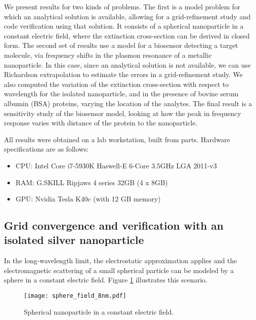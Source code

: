 
We present results for two kinds of problems. 
The first is a model problem for which an analytical solution is available, 
allowing for a grid-refinement study and code verification using that solution.
It consists of a spherical nanoparticle in a constant electric field, 
where the extinction cross-section can be derived in closed form.
The second set of results use a model for a biosensor detecting a target molecule, 
via frequency shifts in the plasmon resonance of a metallic nanoparticle. 
In this case, since an analytical solution is not available, we can use Richardson 
extrapolation to estimate the errors in a grid-refinement study.
We also computed the variation of the extinction cross-section with respect to wavelength
for the isolated nanoparticle, and in the presence of bovine serum albumin (BSA) proteins, 
varying the location of the analytes.
The final result is a sensitivity study of the biosensor model, 
looking at how the peak in frequency response varies with distance of the protein 
to the nanoparticle.

All results were obtained on a lab workstation, built from parts.
Hardware specifications are as follows: 
\begin{itemize}
  \item CPU: Intel Core i7-5930K Haswell-E 6-Core 3.5GHz LGA 2011-v3
  \item RAM: G.SKILL Ripjaws 4 series 32GB (4 x 8GB)
  \item GPU: Nvidia Tesla K40c (with 12 GB memory)
\end{itemize}

\subsection{Grid convergence and verification with an isolated silver nanoparticle} \label{sec:verification}

\noindent In the long-wavelength limit, the electrostatic approximation applies and
the electromagnetic scattering of a small spherical particle can be modeled
by a sphere in a constant electric field. 
Figure \ref{fig:np_elec_field} illustrates this scenario.

%
\begin{figure}[h] %
   \centering
   \texttt{[image: sphere\_field\_8nm.pdf]} 
   \caption{Spherical nanoparticle in a constant electric field.}
   \label{fig:np_elec_field}
\end{figure}
%

